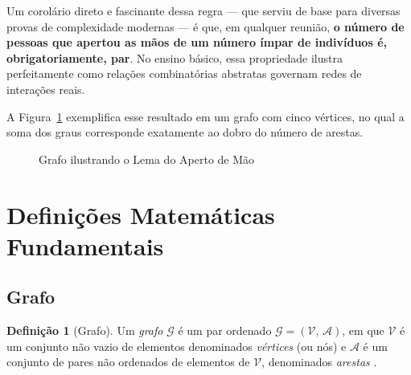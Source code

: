 \documentclass[
  12pt,
  oneside,
  a4paper,
  english,
  brazilian
  ]{abntex2}
\theoremstyle{definition}
\newtheorem{definicao}{Definição}[chapter]
\begin{document}
Um corolário direto e fascinante dessa regra --- que serviu de base para diversas provas de complexidade modernas \cite{thomason1978, papadimitriou1994} --- é que, em qualquer reunião, \textbf{o número de pessoas que apertou as mãos de um número ímpar de indivíduos é, obrigatoriamente, par}. No ensino básico, essa propriedade ilustra perfeitamente como relações combinatórias abstratas governam redes de interações reais.

A Figura~\ref{fig:aperto_mao} exemplifica esse resultado em um grafo com cinco vértices, no qual a soma dos graus corresponde exatamente ao dobro do número de arestas.

\begin{figure}[htbp]
    \centering
    \caption{Grafo ilustrando o Lema do Aperto de Mão}
    \label{fig:aperto_mao}
\end{figure}


\section{Definições Matemáticas Fundamentais}

\subsection{Grafo}

\begin{definicao}[Grafo]
\label{def:grafo}
  Um \textit{grafo} $\mathcal{G}$ é um par ordenado
  $\mathcal{G} = (\mathcal{V},\, \mathcal{A})$, em que $\mathcal{V}$ é um
  conjunto não vazio de elementos denominados \textit{vértices} (ou nós) e
  $\mathcal{A}$ é um conjunto de pares não ordenados de elementos de
  $\mathcal{V}$, denominados \textit{arestas} \cite{boaventura2009}.
\end{definicao}
\end{document}
